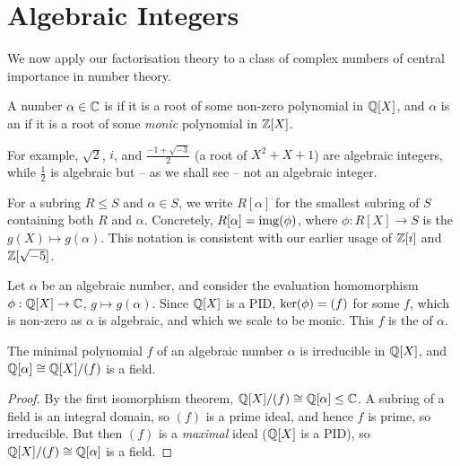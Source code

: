 \documentclass[a4paper]{scrartcl}
\begin{document}
\section{Algebraic Integers}

We now apply our factorisation theory to a class of complex numbers of central importance in number theory.

\begin{definition}
	A number $\alpha \in \mathbb{C}$ is  if it is a root of some non-zero polynomial in $\mathbb{Q}[X]$, and $\alpha$ is an  if it is a root of some \emph{monic} polynomial in $\mathbb{Z}[X]$.
\end{definition}

For example, $\sqrt{2}$, $i$, and $\frac{-1 + \sqrt{-3}}{2}$ (a root of $X^2 + X + 1$) are algebraic integers, while $\frac{1}{2}$ is algebraic but -- as we shall see -- not an algebraic integer.

For a subring $R \leq S$ and $\alpha \in S$, we write $R[\alpha]$ for the smallest subring of $S$ containing both $R$ and $\alpha$. Concretely, $R[\alpha] = \operatorname{img}(\phi)$, where $\phi: R[X] \rightarrow S$ is the  $g(X) \mapsto g(\alpha)$. This notation is consistent with our earlier usage of $\mathbb{Z}[i]$ and $\mathbb{Z}[\sqrt{-5}]$.

\begin{definition}
	Let $\alpha$ be an algebraic number, and consider the evaluation homomorphism $\phi: \mathbb{Q}[X] \rightarrow \mathbb{C}$, $g \mapsto g(\alpha)$. Since $\mathbb{Q}[X]$ is a PID, $\operatorname{ker}(\phi) = (f)$ for some $f$, which is non-zero as $\alpha$ is algebraic, and which we scale to be monic. This $f$ is the  of $\alpha$.
\end{definition}

\begin{proposition}
	The minimal polynomial $f$ of an algebraic number $\alpha$ is irreducible in $\mathbb{Q}[X]$, and $\mathbb{Q}[\alpha] \cong \mathbb{Q}[X]/(f)$ is a field.
\end{proposition}
\begin{proof}
	By the first isomorphism theorem, $\mathbb{Q}[X]/(f) \cong \mathbb{Q}[\alpha] \leq \mathbb{C}$. A subring of a field is an integral domain, so $(f)$ is a prime ideal, and hence $f$ is prime, so irreducible. But then $(f)$ is a \emph{maximal} ideal ($\mathbb{Q}[X]$ is a PID), so $\mathbb{Q}[X]/(f) \cong \mathbb{Q}[\alpha]$ is a field.
\end{proof}
\end{document}

